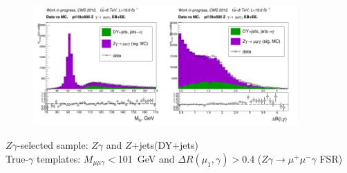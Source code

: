 \begin{frame}
  \begin{figure}[htb]
    \begin{center}
       \includegraphics[width=0.45\textwidth]{../figs/ForPresentation/forDefense_Mllg.png}\includegraphics[width=0.45\textwidth]{../figs/ForPresentation/forDefense_dR.png}\\
    \end{center}
  \end{figure}
\tiny
$Z\gamma$-selected sample: $Z\gamma$ and $Z$+jets(DY+jets)\\
True-$\gamma$ templates: $M_{\mu\mu\gamma}<$101~GeV and $\Delta R(\mu_{1},\gamma)>$0.4 ($Z\gamma\rightarrow\mu^+ \mu^- \gamma $ FSR)\\

\end{frame}%

